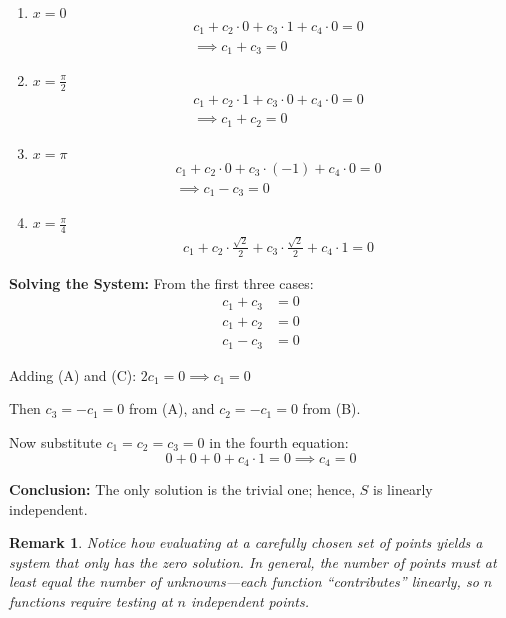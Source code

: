 \documentclass[12pt]{article}
\newtheorem{remark}[theorem]{Remark}
\begin{document}
\begin{enumerate}[label=\textbf{Case \arabic*:},leftmargin=*]
    \item $x = 0$
    \begin{align*}
        &c_1 + c_2 \cdot 0 + c_3 \cdot 1 + c_4 \cdot 0 = 0\\
        &\implies c_1 + c_3 = 0
    \end{align*}

    \item $x = \frac{\pi}{2}$
    \begin{align*}
        &c_1 + c_2 \cdot 1 + c_3 \cdot 0 + c_4 \cdot 0 = 0\\
        &\implies c_1 + c_2 = 0
    \end{align*}

    \item $x = \pi$
    \begin{align*}
        &c_1 + c_2 \cdot 0 + c_3 \cdot (-1) + c_4 \cdot 0 = 0\\
        &\implies c_1 - c_3 = 0
    \end{align*}

    \item $x = \frac{\pi}{4}$
    \begin{align*}
        &c_1 + c_2 \cdot \frac{\sqrt{2}}{2} + c_3 \cdot \frac{\sqrt{2}}{2} + c_4 \cdot 1 = 0
    \end{align*}
\end{enumerate}

\textbf{Solving the System:}
From the first three cases:
\begin{align*}
c_1 + c_3 &= 0 \tag{A}\\
c_1 + c_2 &= 0 \tag{B}\\
c_1 - c_3 &= 0 \tag{C}
\end{align*}

Adding (A) and (C): $2c_1 = 0 \implies c_1 = 0$

Then $c_3 = -c_1 = 0$ from (A), and $c_2 = -c_1 = 0$ from (B).

Now substitute $c_1 = c_2 = c_3 = 0$ in the fourth equation:
\[
0 + 0 + 0 + c_4 \cdot 1 = 0 \implies c_4 = 0
\]

\textbf{Conclusion:} The only solution is the trivial one; hence, $S$ is linearly independent.

\begin{remark}
Notice how evaluating at a carefully chosen set of points yields a system that only has the zero solution. In general, the number of points must at least equal the number of unknowns—each function ``contributes'' linearly, so $n$ functions require testing at $n$ independent points.
\end{remark}
\end{document}
